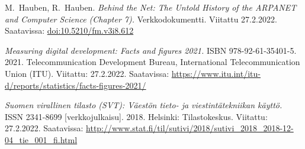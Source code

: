 \documentclass[finnish, 12pt, a4paper, elec, utf8, a-1b, online]{aaltothesis}
\begin{document}
\thesisbibliography
\begin{thebibliography}{99}

    M.\ Hauben, R.\ Hauben.
    \textit{Behind the Net: The Untold History of the ARPANET and Computer Science (Chapter 7).}
    Verkkodokumentti.
    Viitattu 27.2.2022.
    Saatavissa: \url{doi:10.5210/fm.v3i8.612}

    \textit{Measuring digital development: Facts and figures 2021.}
    ISBN 978-92-61-35401-5.
    2021.
    Telecommunication Development Bureau, International Telecommunication Union (ITU).
    Viitattu: 27.2.2022.
    Saatavissa: \url{https://www.itu.int/itu-d/reports/statistics/facts-figures-2021/}

    \textit{Suomen virallinen tilasto (SVT): Väestön tieto- ja viestintätekniikan käyttö.}
    ISSN 2341-8699 [verkkojulkaisu].
    2018.
    Helsinki: Tilastokeskus.
    Viitattu: 27.2.2022.
    Saatavissa: \url{http://www.stat.fi/til/sutivi/2018/sutivi_2018_2018-12-04_tie_001_fi.html}

\end{thebibliography}


\end{document}
